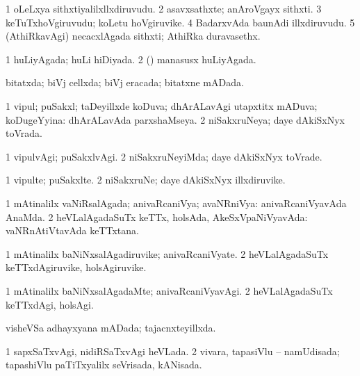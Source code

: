 {{\bentry
{} 
\gl{\nA}
\expl{}
\bmng
\bnum
\num{1} oLeLxya sithxtiyalilxllxdiruvudu. 
\num{2} asavxsathxte; anAroVgayx sithxti. 
\num{3} keTuTxhoVgiruvudu; koLetu hoVgiruvike. 
\num{4} BadarxvAda baunAdi illxdiruvudu. 
\num{5} (AthiRkavAgi) necacxlAgada sithxti; AthiRka duravasethx. 
\enum
\emng
\eentry

\bentry
{} 
\gl{\gu}
\expl{}
\bmng
\bnum
\num{1} huLiyAgada; huLi hiDiyada. 
\num{2} (\rUpa) manasusx huLiyAgada. 
\enum
\emng
\eentry

\bentry
{} 
\gl{\gu}
\expl{}
\bmng
bitatxda; biVj cellxda; biVj eracada; bitatxne mADada. 
\emng
\eentry

\bentry
{} 
\gl{\gu}
\expl{}
\bmng
\bnum
\num{1} vipul; puSakxl; taDeyillxde koDuva; dhArALavAgi utapxtitx mADuva; koDugeYyina:  dhArALavAda parxshaMseya. 
\num{2} niSakxruNeya; daye dAkiSxNyx toVrada. 
\enum
\emng
\eentry

\bentry
{} 
\gl{\kirxvi}
\bmng
\bnum
\num{1} vipulvAgi; puSakxlvAgi. 
\num{2} niSakxruNeyiMda; daye dAkiSxNyx toVrade. 
\enum
\emng
\eentry

\bentry
{} 
\gl{\nA}
\expl{}
\bmng
\bnum
\num{1} vipulte; puSakxlte. 
\num{2} niSakxruNe; daye dAkiSxNyx illxdiruvike. 
\enum
\emng
\eentry

\bentry
{} 
\gl{\gu}
\expl{}
\bmng
\bnum
\num{1} mAtinalilx vaNiRsalAgada; anivaRcaniVya; avaNRniVya:  anivaRcaniVyavAda AnaMda. 
\num{2} heVLalAgadaSuTx keTTx, holsAda, AkeSxVpaNiVyavAda:  vaNRnAtiVtavAda keTTxtana. 
\enum
\emng
\eentry

\bentry
{} 
\gl{\nA}
\expl{}
\bmng
\bnum
\num{1} mAtinalilx baNiNxsalAgadiruvike; anivaRcaniVyate. 
\num{2} heVLalAgadaSuTx keTTxdAgiruvike, holsAgiruvike. 
\enum
\emng
\eentry

\bentry
{} 
\gl{\kirxvi}
\bmng
\bnum
\num{1} mAtinalilx baNiNxsalAgadaMte; anivaRcaniVyavAgi. 
\num{2} heVLalAgadaSuTx keTTxdAgi, holsAgi. 
\enum
\emng
\eentry

\bentry
{} 
\gl{\gu}
\expl{}
\bmng
visheVSa adhayxyana mADada; tajacnxteyillxda. 
\emng
\eentry

\bentry
{} 
\gl{\gu}
\expl{}
\bmng
\bnum
\num{1} sapxSaTxvAgi, nidiRSaTxvAgi heVLada. 
\num{2} vivara, tapasiVlu -- namUdisada; tapashiVlu paTiTxyalilx seVrisada, kANisada. 
\enum
\emng
\eentry

}}
